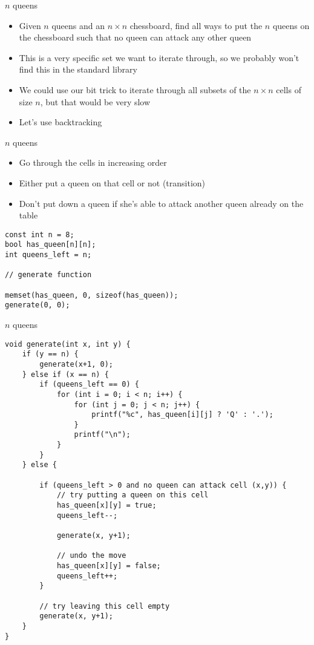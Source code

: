 \documentclass[12pt,t]{beamer}
\newcommand{\bi}{\begin{itemize}}
\newcommand{\ei}{\end{itemize}}
\begin{document}
\begin{frame}[fragile]{$n$ queens}
    \vspace{20pt}
    \bi
        \item Given $n$ queens and an $n\times n$ chessboard, find all ways to
            put the $n$ queens on the chessboard such that no queen can attack
            any other queen

        \vspace{10pt}

        \item This is a very specific set we want to iterate through, so we probably won't find this in the standard library
        \item We could use our bit trick to iterate through all subsets of the $n\times n$ cells of size $n$, but that would be very slow
        \vspace{20pt}
        \item Let's use backtracking
    \ei
\end{frame}

\begin{frame}[fragile]{$n$ queens}
    \vspace{10pt}
    \bi
        \item Go through the cells in increasing order
        \item Either put a queen on that cell or not (transition)
        \item Don't put down a queen if she's able to attack another queen already on the table
    \ei

    \vspace{10pt}

    \begin{verbatim}
const int n = 8;
bool has_queen[n][n];
int queens_left = n;

// generate function

memset(has_queen, 0, sizeof(has_queen));
generate(0, 0);
    \end{verbatim}
\end{frame}

\begin{frame}[fragile]{$n$ queens}
    \begin{verbatim}
void generate(int x, int y) {
    if (y == n) {
        generate(x+1, 0);
    } else if (x == n) {
        if (queens_left == 0) {
            for (int i = 0; i < n; i++) {
                for (int j = 0; j < n; j++) {
                    printf("%c", has_queen[i][j] ? 'Q' : '.');
                }
                printf("\n");
            }
        }
    } else {

        if (queens_left > 0 and no queen can attack cell (x,y)) {
            // try putting a queen on this cell
            has_queen[x][y] = true;
            queens_left--;

            generate(x, y+1);

            // undo the move
            has_queen[x][y] = false;
            queens_left++;
        }

        // try leaving this cell empty
        generate(x, y+1);
    }
}
    \end{verbatim}
\end{frame}
\end{document}
